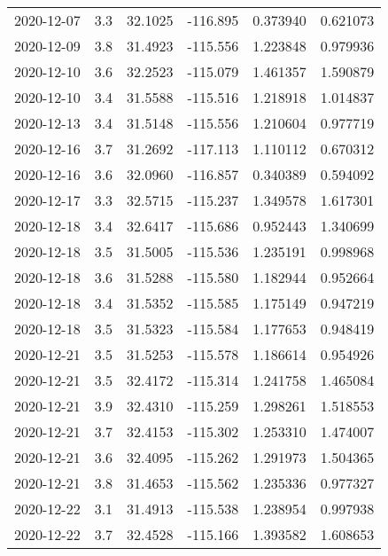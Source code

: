 \begin{tabular}{lrrrrr}
2020-12-07 &       3.3 &  32.1025 &  -116.895 &         0.373940 &         0.621073 \\
2020-12-09 &       3.8 &  31.4923 &  -115.556 &         1.223848 &         0.979936 \\
2020-12-10 &       3.6 &  32.2523 &  -115.079 &         1.461357 &         1.590879 \\
2020-12-10 &       3.4 &  31.5588 &  -115.516 &         1.218918 &         1.014837 \\
2020-12-13 &       3.4 &  31.5148 &  -115.556 &         1.210604 &         0.977719 \\
2020-12-16 &       3.7 &  31.2692 &  -117.113 &         1.110112 &         0.670312 \\
2020-12-16 &       3.6 &  32.0960 &  -116.857 &         0.340389 &         0.594092 \\
2020-12-17 &       3.3 &  32.5715 &  -115.237 &         1.349578 &         1.617301 \\
2020-12-18 &       3.4 &  32.6417 &  -115.686 &         0.952443 &         1.340699 \\
2020-12-18 &       3.5 &  31.5005 &  -115.536 &         1.235191 &         0.998968 \\
2020-12-18 &       3.6 &  31.5288 &  -115.580 &         1.182944 &         0.952664 \\
2020-12-18 &       3.4 &  31.5352 &  -115.585 &         1.175149 &         0.947219 \\
2020-12-18 &       3.5 &  31.5323 &  -115.584 &         1.177653 &         0.948419 \\
2020-12-21 &       3.5 &  31.5253 &  -115.578 &         1.186614 &         0.954926 \\
2020-12-21 &       3.5 &  32.4172 &  -115.314 &         1.241758 &         1.465084 \\
2020-12-21 &       3.9 &  32.4310 &  -115.259 &         1.298261 &         1.518553 \\
2020-12-21 &       3.7 &  32.4153 &  -115.302 &         1.253310 &         1.474007 \\
2020-12-21 &       3.6 &  32.4095 &  -115.262 &         1.291973 &         1.504365 \\
2020-12-21 &       3.8 &  31.4653 &  -115.562 &         1.235336 &         0.977327 \\
2020-12-22 &       3.1 &  31.4913 &  -115.538 &         1.238954 &         0.997938 \\
2020-12-22 &       3.7 &  32.4528 &  -115.166 &         1.393582 &         1.608653 \\

\end{tabular}
